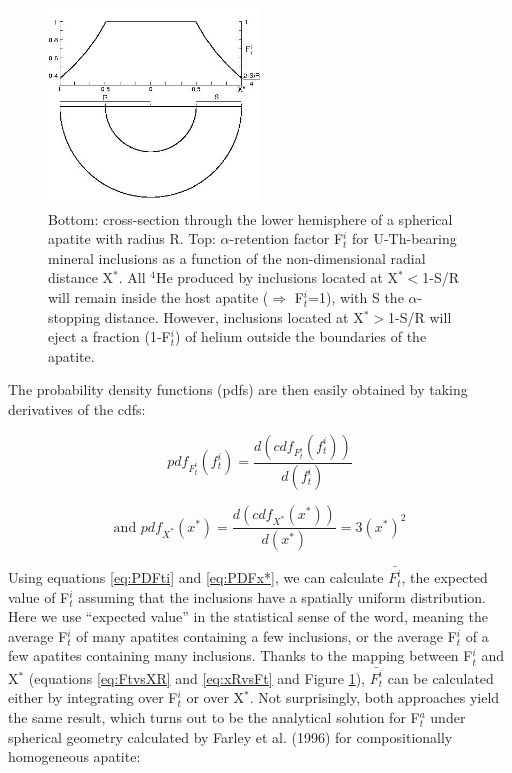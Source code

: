 \documentclass{article}
\begin{document}
\begin{figure}[htbp]
  \centering
  \includegraphics[width=0.5\textwidth]{FtivsXstar.jpg}
  \caption{Bottom: cross-section through the lower hemisphere of a spherical apatite with radius R.
    Top:  $\alpha$-retention factor  F$_t^i$ for  U-Th-bearing mineral
    inclusions as  a function  of the non-dimensional  radial distance
    X$^*$.  All  $^4$He produced by inclusions  located at X$^*<$1-S/R
    will  remain inside  the host  apatite  ($\Rightarrow$ F$_t^i$=1),
    with  S  the   $\alpha$-stopping  distance.   However,  inclusions
    located at X$^*>$1-S/R will eject a fraction (1-F$_t^i$) of helium
    outside the boundaries of the apatite.}
  \label{fig:FtivsXstar}
\end{figure}

The probability  density functions (pdfs) are then  easily obtained by
taking derivatives of the cdfs:

\begin{equation}
  \label{eq:PDFti}
  pdf_{F_t^i}(f_t^i) = \frac{d(cdf_{F_t^i}(f_t^i))}{d(f_t^i)}
\end{equation}

\begin{equation}
  \label{eq:PDFx*}
\mbox{and~}  pdf_{X^*}(x^*) = \frac{d(cdf_{X^*}(x^*))}{d(x^*)} = 3(x^*)^2
\end{equation}

Using  equations \ref{eq:PDFti} and  \ref{eq:PDFx*}, we  can calculate
$\bar{F_t^i}$,  the  expected  value  of  F$_t^i$  assuming  that  the
inclusions  have  a  spatially  uniform  distribution.   Here  we  use
``expected value'' in  the statistical sense of the  word, meaning the
average F$_t^i$ of  many apatites containing a few  inclusions, or the
average F$_t^i$ of a  few apatites containing many inclusions.  Thanks
to the  mapping between  F$_t^i$ and X$^*$  (equations \ref{eq:FtvsXR}
and  \ref{eq:xRvsFt} and  Figure  \ref{fig:FtivsXstar}), $\bar{F_t^i}$
can be  calculated either by integrating  over F$_t^i$ or  over X$^*$. 
Not surprisingly,  both approaches yield the same  result, which turns
out to be the analytical solution for F$_t^a$ under spherical geometry
calculated  by Farley  et al.  (1996) for  compositionally homogeneous
apatite:
\end{document}
